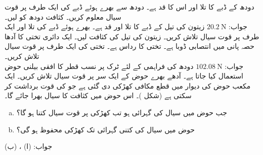 دودھ کے ڈبے کا تلا  اور اس کا قد  ہے۔ دودھ سے بھرے ہوئے ڈبے کی ایک طرف پر قوت سیال معلوم کریں۔ کثافت دودھ کو  لیں۔\\
جواب:\quad
$\SI{20.2}{\newton}$
زیتون کی تیل کے ڈبے کا تلا  اور قد  ہے۔ بھرے ہوئے ڈبے کی تلا اور ایک طرف پر قوت سیال تلاش کریں۔ زیتون کی تیل کی کثافت  لیں۔
ایک دائری تختی کا آدھا حصہ پانی میں انتصابی ڈوبا ہے۔ تختی کا رداس  ہے۔ تختی کی ایک طرف پر قوت سیال تلاش کریں۔\\
جواب:\quad
 $\SI{102.08}{\newton}$
دودھ کی فراہمی کے لئے ٹرک پر نسب   قطر کا افقی بیلنی حوض استعمال کیا جاتا ہے۔ آدھے بھرے حوض کے ایک سر پر قوت سیال تلاش کریں۔ 
ایک مکعب حوض کی دیوار میں قطع مکافی کھڑکی دی گئی ہے جو  کی قوت برداشت کر سکتی ہے (شکل )۔ اس حوض میں  کثافت کا سیال بھرا جائے گا۔ 
\begin{enumerate}[a.]
\item
جب حوض میں سیال کی گہرائی  ہو تب کھڑکی پر قوت سیال کتنا ہو گا؟
\item
حوض میں سیال کی کتنی گہرائی تک کھڑکی محفوظ ہو گی؟
\end{enumerate}
جواب:\quad
(ا) ، (ب) 
